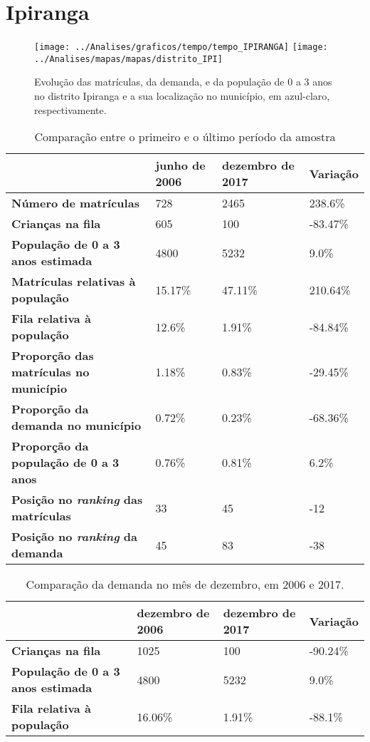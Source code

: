\section{Ipiranga}
\begin{figure}[H]
\centering
\texttt{[image: ../Analises/graficos/tempo/tempo\_IPIRANGA]}
\texttt{[image: ../Analises/mapas/mapas/distrito\_IPI]}
\caption{Evolução das matrículas, da demanda, e da população de 0 a 3 anos no distrito Ipiranga e a sua localização no município, em azul-claro, respectivamente.}
\end{figure}
\begin{table}[H]
\begin{tabular}{l|l|l|l}
\textbf{}                                      & \textbf{junho de 2006}       & \textbf{dezembro de 2017}    & \textbf{Variação} \\ \hline
\textbf{Número de matrículas}                  & 728 & 2465 & 238.6\% \\ \hline
\textbf{Crianças na fila}                      & 605 & 100 & -83.47\% \\ \hline
\textbf{População de 0 a 3 anos estimada}      & 4800 & 5232 & 9.0\% \\ \hline
\textbf{Matrículas relativas à população}      & 15.17\% & 47.11\% & 210.64\% \\ \hline
\textbf{Fila relativa à população}             & 12.6\% & 1.91\% & -84.84\% \\ \hline
\textbf{Proporção das matrículas no município} & 1.18\% & 0.83\% & -29.45\% \\ \hline
\textbf{Proporção da demanda no município}     & 0.72\% & 0.23\% & -68.36\% \\ \hline
\textbf{Proporção da população de 0 a 3 anos}  & 0.76\% & 0.81\% & 6.2\% \\ \hline
\textbf{Posição no \textit{ranking} das matrículas}     & 33 & 45 & -12 \\ \hline
\textbf{Posição no \textit{ranking} da demanda}         & 45 & 83 & -38 \\ 
\end{tabular}
\caption{Comparação entre o primeiro e o último período da amostra}
\end{table}
\begin{table}[H]
\begin{tabular}{l|l|l|l}
\textbf{}                                 & \textbf{dezembro de 2006} & \textbf{dezembro de 2017} & \textbf{Variação} \\ \hline
\textbf{Crianças na fila}                      & 1025 & 100 & -90.24\% \\ \hline
\textbf{População de 0 a 3 anos estimada}      & 4800 & 5232 & 9.0\% \\ \hline
\textbf{Fila relativa à população}             & 16.06\% & 1.91\% & -88.1\% \\
\end{tabular}
\caption{Comparação da demanda no mês de dezembro, em 2006 e 2017.}
\end{table}
